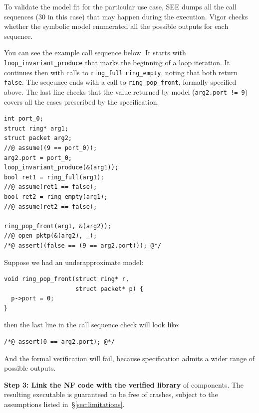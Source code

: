 \documentclass[letterpaper,twocolumn,10pt]{article}
\newcommand{\code}[1]{\lstinline{#1}}
\begin{document}
To validate the model fit for the particular use case, SEE dumps
all the call sequences (30 in this case) that may happen during the execution.
Vigor checks whether the symbolic model enumerated all the possible
outputs for each sequence.

You can see the example call sequence below. It starts with
\code{loop_invariant_produce} that marks the beginning of a loop iteration. It
continues then with calls to \code{ring_full} \code{ring_empty}, noting that
both return \code{false}. The seqeunce ends with a call to
\code{ring_pop_front}, formally specified above. The last line checks that the
value returned by model (\code{arg2.port != 9}) covers all the cases prescribed
by the specification.
 
\begin{lstlisting}
int port_0;
struct ring* arg1;
struct packet arg2;
//@ assume((9 == port_0));
arg2.port = port_0;
loop_invariant_produce(&(arg1));
bool ret1 = ring_full(arg1);
//@ assume(ret1 == false);
bool ret2 = ring_empty(arg1);
//@ assume(ret2 == false);

ring_pop_front(arg1, &(arg2));
//@ open pktp(&(arg2), _);
/*@ assert((false == (9 == arg2.port))); @*/
\end{lstlisting}

Suppose we had an underapproximate model:
\begin{lstlisting}
void ring_pop_front(struct ring* r,
                    struct packet* p) {
  p->port = 0;
}
\end{lstlisting}
then the last line in the call sequence check will look like:
\begin{lstlisting}
/*@ assert(0 == arg2.port); @*/
\end{lstlisting}
And the formal verification will fail, because specification admits a wider
range of possible outputs.

{\bf Step 3: Link the NF code with the verified library} of components. The resulting executable is guaranteed to be free of crashes, subject to the assumptions listed in~\S\ref{sec:limitations}.

\end{document}
